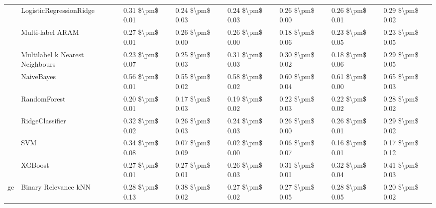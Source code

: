 \begin{tabular}{llllllll}
   & LogisticRegressionRidge &      0.31 \$\textbackslash pm\$ 0.01 &           0.24 \$\textbackslash pm\$ 0.03 &       0.24 \$\textbackslash pm\$ 0.03 &        0.26 \$\textbackslash pm\$ 0.00 &                         0.26 \$\textbackslash pm\$ 0.01 &      0.29 \$\textbackslash pm\$ 0.02 \\
   & Multi-label ARAM &      0.27 \$\textbackslash pm\$ 0.01 &           0.26 \$\textbackslash pm\$ 0.00 &       0.26 \$\textbackslash pm\$ 0.00 &        0.18 \$\textbackslash pm\$ 0.06 &                         0.23 \$\textbackslash pm\$ 0.05 &      0.23 \$\textbackslash pm\$ 0.05 \\
   & Multilabel k Nearest Neighbours &      0.23 \$\textbackslash pm\$ 0.07 &           0.25 \$\textbackslash pm\$ 0.03 &       0.31 \$\textbackslash pm\$ 0.03 &        0.30 \$\textbackslash pm\$ 0.02 &                         0.18 \$\textbackslash pm\$ 0.06 &      0.29 \$\textbackslash pm\$ 0.05 \\
   & NaiveBayes &      0.56 \$\textbackslash pm\$ 0.01 &           0.55 \$\textbackslash pm\$ 0.02 &       0.58 \$\textbackslash pm\$ 0.02 &        0.60 \$\textbackslash pm\$ 0.04 &                         0.61 \$\textbackslash pm\$ 0.00 &      0.65 \$\textbackslash pm\$ 0.03 \\
   & RandomForest &      0.20 \$\textbackslash pm\$ 0.01 &           0.17 \$\textbackslash pm\$ 0.03 &       0.19 \$\textbackslash pm\$ 0.02 &        0.22 \$\textbackslash pm\$ 0.03 &                         0.22 \$\textbackslash pm\$ 0.02 &      0.28 \$\textbackslash pm\$ 0.02 \\
   & RidgeClassifier &      0.32 \$\textbackslash pm\$ 0.02 &           0.26 \$\textbackslash pm\$ 0.03 &       0.24 \$\textbackslash pm\$ 0.03 &        0.26 \$\textbackslash pm\$ 0.00 &                         0.26 \$\textbackslash pm\$ 0.01 &      0.29 \$\textbackslash pm\$ 0.02 \\
   & SVM &      0.34 \$\textbackslash pm\$ 0.08 &           0.07 \$\textbackslash pm\$ 0.09 &       0.02 \$\textbackslash pm\$ 0.00 &        0.06 \$\textbackslash pm\$ 0.07 &                         0.16 \$\textbackslash pm\$ 0.01 &      0.17 \$\textbackslash pm\$ 0.12 \\
   & XGBoost &      0.27 \$\textbackslash pm\$ 0.01 &           0.27 \$\textbackslash pm\$ 0.01 &       0.26 \$\textbackslash pm\$ 0.03 &        0.31 \$\textbackslash pm\$ 0.01 &                         0.32 \$\textbackslash pm\$ 0.04 &      0.41 \$\textbackslash pm\$ 0.03 \\
ge & Binary Relevance kNN &      0.28 \$\textbackslash pm\$ 0.13 &           0.38 \$\textbackslash pm\$ 0.02 &       0.27 \$\textbackslash pm\$ 0.02 &        0.27 \$\textbackslash pm\$ 0.05 &                         0.28 \$\textbackslash pm\$ 0.05 &      0.20 \$\textbackslash pm\$ 0.02 \\

\end{tabular}
